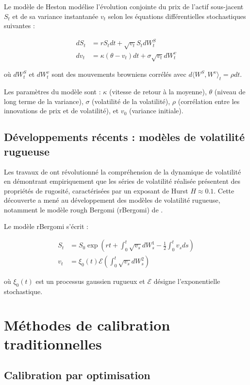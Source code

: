 Le modèle de Heston modélise l'évolution conjointe du prix de l'actif sous-jacent $S_t$ et de sa variance instantanée $v_t$ selon les équations différentielles stochastiques suivantes :

\begin{align}
dS_t &= rS_t dt + \sqrt{v_t}S_t dW_t^S \\
dv_t &= \kappa(\theta - v_t)dt + \sigma \sqrt{v_t}dW_t^v
\end{align}

où $dW_t^S$ et $dW_t^v$ sont des mouvements browniens corrélés avec $d\langle W^S, W^v \rangle_t = \rho dt$.

Les paramètres du modèle sont : $\kappa$ (vitesse de retour à la moyenne), $\theta$ (niveau de long terme de la variance), $\sigma$ (volatilité de la volatilité), $\rho$ (corrélation entre les innovations de prix et de volatilité), et $v_0$ (variance initiale).

\subsection{Développements récents : modèles de volatilité rugueuse}

Les travaux de \citet{gatheral2018volatility} ont révolutionné la compréhension de la dynamique de volatilité en démontrant empiriquement que les séries de volatilité réalisée présentent des propriétés de rugosité, caractérisées par un exposant de Hurst $H \approx 0.1$. Cette découverte a mené au développement des modèles de volatilité rugueuse, notamment le modèle rough Bergomi (rBergomi) de \citet{bayer2016pricing}.

Le modèle rBergomi s'écrit :

\begin{align}
S_t &= S_0 \exp\left(rt + \int_0^t \sqrt{v_s} dW_s^1 - \frac{1}{2}\int_0^t v_s ds\right) \\
v_t &= \xi_0(t) \mathcal{E}\left(\int_0^t \sqrt{v_s} dW_s^2\right)
\end{align}

où $\xi_0(t)$ est un processus gaussien rugueux et $\mathcal{E}$ désigne l'exponentielle stochastique.

\section{Méthodes de calibration traditionnelles}

\subsection{Calibration par optimisation}

